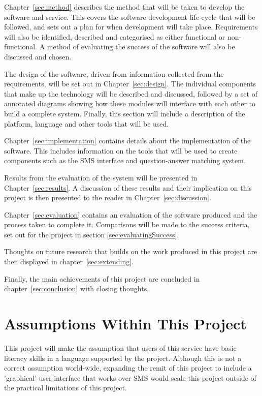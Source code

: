 \documentclass[authoryearcitations]{UoYCSproject}
\begin{document}
Chapter~\ref{sec:method} describes the method that will be taken to develop the software and service.  This covers the software development life-cycle that will be followed, and sets out a plan for when development will take place.  Requirements will also be identified, described and categorised  as either functional or non-functional.  A method of evaluating the success of the software will also be discussed and chosen.

The design of the software, driven from information collected from the requirements, will be set out in Chapter~\ref{sec:design}.  The individual components that make up the technology will be described and discussed, followed by a set of annotated diagrams showing how these modules will interface with each other to build a complete system.  Finally, this section will include a description of the platform, language and other tools that will be used.

Chapter~\ref{sec:implementation} contains details about the implementation of the software.  This includes information on the tools that will be used to create components such as the SMS interface and question-answer matching system.

Results from the evaluation of the system will be presented in Chapter~\ref{sec:results}.  A discussion of these results and their implication on this project is then presented to the reader in Chapter~\ref{sec:discussion}.

Chapter~\ref{sec:evaluation} contains an evaluation of the software produced and the process taken to complete it.  Comparisons will be made to the success criteria, set out for the project in section \ref{sec:evaluatingSuccess}.

Thoughts on future research that builds on the work produced in this project are then displayed in chapter~\ref{sec:extending}.

Finally, the main achievements of this project are concluded in chapter~\ref{sec:conclusion} with closing thoughts.


\section{Assumptions Within This Project}
This project will make the assumption that users of this service have basic literacy skills in a language supported by the project.  Although this is not a correct assumption world-wide, expanding the remit of this project to include a 'graphical' user interface that works over SMS would scale this project outside of the practical limitations of this project.
\end{document}
